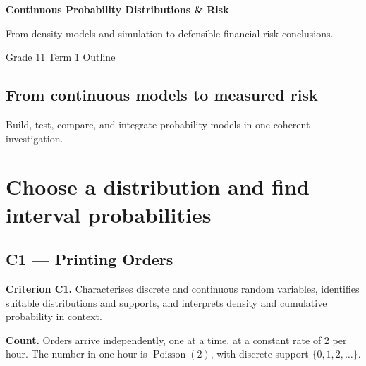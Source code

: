 \makeatletter
{}
\makeatother


\geometry{letterpaper,margin=0.73in}
\linespread{1.06}
\setlength{\parskip}{4pt minus 3pt}
\setcounter{secnumdepth}{1}
\renewcommand{\thesection}{Step~\arabic{section}}

\newcommand{\CriterionText}[2]{%
  {\small\textbf{\textcolor{taskLinkDarkBlue}{Criterion #1.}} #2\par}\smallskip}


\begin{center}
  {\LARGE\bfseries Continuous Probability Distributions \& Risk\par}
  \smallskip
  From density models and simulation to defensible financial risk conclusions.
  \par\medskip
  {\small Grade 11 \textperiodcentered{} Term 1 \textperiodcentered{} Outline\par}
\end{center}

\subsection*{From continuous models to measured risk}
Build, test, compare, and integrate probability models in one coherent investigation.

\section{Choose a distribution and find interval probabilities}

\subsection*{C1 --- Printing Orders}
\CriterionText{C1}{Characterises discrete and continuous random variables, identifies suitable distributions and supports, and interprets density and cumulative probability in context.}

\textbf{Count.} Orders arrive independently, one at a time, at a constant rate of 2 per hour. The number in one hour is \(\operatorname{Poisson}(2)\), with discrete support \(\{0,1,2,\ldots\}\).

